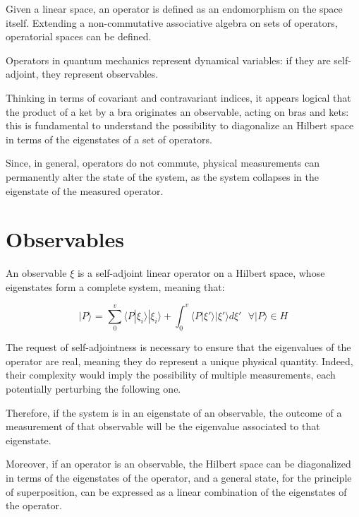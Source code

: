 \documentclass{report}
\begin{document}
Given a linear space, an operator is defined as an endomorphism on the space itself.
Extending a non-commutative associative algebra on sets of operators, operatorial spaces can be defined.

Operators in quantum mechanics represent dynamical variables: if they are self-adjoint, they represent observables.

Thinking in terms of covariant and contravariant indices, it appears logical that the product of a ket by a bra originates an observable, acting on bras and kets:
this is fundamental to understand the possibility to diagonalize an Hilbert space in terms of the eigenstates of a set of operators.

Since, in general, operators do not commute, physical measurements can permanently alter the state of the system, as the system collapses in the eigenstate of the measured operator.

\section{Observables}

\begin{tcolorbox}[colframe=gray!90, colback=blue!5, coltitle=white, title=\textbf{Definition: Observable}, fonttitle=\large\bfseries]
  An observable $\xi$ is a self-adjoint linear operator on a Hilbert space, whose eigenstates form a complete system, meaning that:

  \begin{equation}
    \text{$|P\rangle$ = $\sum_{0}^{v} \langle P|\xi_i\rangle |\xi_i\rangle  + \int_{0}^{v} \langle P|\xi'\rangle |\xi'\rangle d\xi'$  $\forall |P\rangle \in H$}
  \end{equation}
\end{tcolorbox}

The request of self-adjointness is necessary to ensure that the eigenvalues of the operator are real, meaning they do represent a unique physical quantity.
Indeed, their complexity would imply the possibility of multiple measurements, each potentially perturbing the following one.

Therefore, if the system is in an eigenstate of an observable, the outcome of a measurement of that observable will be the eigenvalue associated to that eigenstate.

Moreover, if an operator is an observable, the Hilbert space can be diagonalized in terms of the eigenstates of the operator, and a general state,
for the principle of superposition, can be expressed as a linear combination of the eigenstates of the operator.
\end{document}
